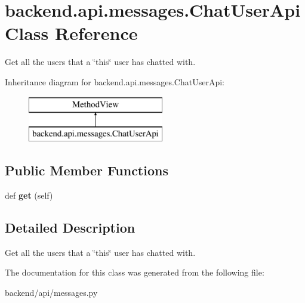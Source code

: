 \hypertarget{classbackend_1_1api_1_1messages_1_1_chat_user_api}{}\section{backend.\+api.\+messages.\+Chat\+User\+Api Class Reference}
\label{classbackend_1_1api_1_1messages_1_1_chat_user_api}


Get all the users that a \char`\"{}this\char`\"{} user has chatted with.  


Inheritance diagram for backend.\+api.\+messages.\+Chat\+User\+Api\+:\begin{figure}[H]
\begin{center}
\leavevmode
\includegraphics[height=2.000000cm]{classbackend_1_1api_1_1messages_1_1_chat_user_api}
\end{center}
\end{figure}
\subsection*{Public Member Functions}
\begin{DoxyCompactItemize}
\item 
\hypertarget{classbackend_1_1api_1_1messages_1_1_chat_user_api_a039426977e5d90abdd11c1c56db6e7b2}{}def {\bfseries get} (self)\label{classbackend_1_1api_1_1messages_1_1_chat_user_api_a039426977e5d90abdd11c1c56db6e7b2}

\end{DoxyCompactItemize}


\subsection{Detailed Description}
Get all the users that a \char`\"{}this\char`\"{} user has chatted with. 

The documentation for this class was generated from the following file\+:\begin{DoxyCompactItemize}
\item 
backend/api/messages.\+py\end{DoxyCompactItemize}
